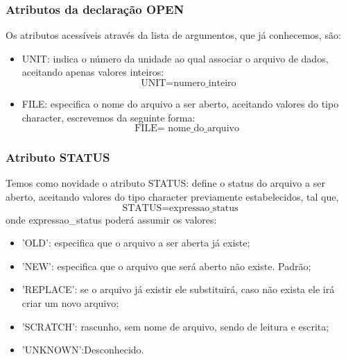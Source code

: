 \documentclass[notes=show]{beamer}
\begin{document}
\begin{frame}%
\frametitle{Atributos da declaração OPEN}
Os atributos acessíveis através da lista de argumentos, que já conhecemos, são:
\begin{itemize}
		\item UNIT: indica o n\'{u}mero da unidade ao qual associar o arquivo de
		dados, aceitando apenas valores inteiros:%
		\[
		\text{UNIT=numero\_inteiro} 
		\]
		
		\item FILE: especifica o nome do arquivo a ser aberto, aceitando valores do
		tipo character, escrevemos da seguinte forma:%
		\[
		\text{FILE= nome\_do\_arquivo  } 
		\]
\end{itemize}

\end{frame}%
\frametitle{Atributo STATUS}
\begin{frame}
Temos como novidade o atributo STATUS: define o status do arquivo a ser aberto, aceitando valores do
tipo character previamente estabelecidos, tal que,%
\[
\text{STATUS=expressao\_status} 
\]%
onde expressao\_status poder\'{a} assumir os valores:
	\begin{itemize}
		\item 'OLD': especifica que o arquivo a ser aberta j\'{a} existe;
		
		\item 'NEW': especifica que o arquivo que ser\'{a} aberto não existe. Padrão;
		
		\item 'REPLACE': se o arquivo j\'{a} existir ele substituirá, caso n\~{a}o
		exista ele irá criar um novo arquivo;
		
		\item 'SCRATCH': rascunho, sem nome de arquivo, sendo de leitura e escrita;
		
		\item 'UNKNOWN':Desconhecido.
	\end{itemize}
\end{frame}
\end{document}
